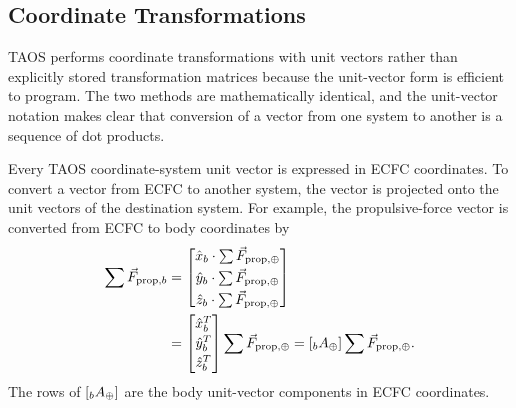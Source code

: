 \subsection{Coordinate Transformations}\label{sec:coordinate-transformations}

TAOS performs coordinate transformations with unit vectors rather than explicitly
stored transformation matrices because the unit-vector form is efficient to program.
The two methods are mathematically identical, and the unit-vector notation makes
clear that conversion of a vector from one system to another is a sequence of dot
products.

Every TAOS coordinate-system unit vector is expressed in ECFC coordinates. To
convert a vector from ECFC to another system, the vector is projected onto the unit
vectors of the destination system. For example, the propulsive-force vector is
converted from ECFC to body coordinates by
\begin{equation}
  \begin{aligned}
  \sum\vec F_{\mathrm{prop},b}
  &=
  \begin{bmatrix}
    \hat x_b\mathbin{\cdot}\sum\vec F_{\mathrm{prop},\oplus}\\[0.25em]
    \hat y_b\mathbin{\cdot}\sum\vec F_{\mathrm{prop},\oplus}\\[0.25em]
    \hat z_b\mathbin{\cdot}\sum\vec F_{\mathrm{prop},\oplus}
  \end{bmatrix}\\
  &=
  \begin{bmatrix}
    \hat x_b^{T}\\[0.2em]
    \hat y_b^{T}\\[0.2em]
    \hat z_b^{T}
  \end{bmatrix}
  \sum\vec F_{\mathrm{prop},\oplus}
  =[{}_{b}A_{\oplus}]\sum\vec F_{\mathrm{prop},\oplus}.
  \end{aligned}
  \label{eq:ecfc-to-body-force-transformation}
\end{equation}
The rows of $[{}_{b}A_{\oplus}]$ are the body unit-vector components in
ECFC coordinates.


